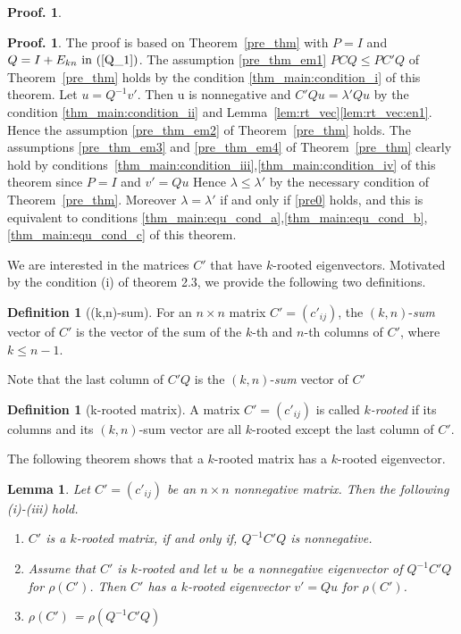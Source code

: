 \documentclass{article}
\theoremstyle{plain}
\newtheorem{lem}[thm]{Lemma}
\theoremstyle{definition}
\newtheorem{defn}[thm]{Definition}
\newtheorem{pof}[thm]{Proof.}
\begin{document}
\begin{pof}
   
\begin{pof}
    The proof is based on Theorem~\ref{pre_thm} with $P = I$ and $Q = I + E_{kn} \text{ in } (\ref{Q_1} )$. 
    The assumption \ref{pre_thm_em1} $PCQ\leq PC'Q$ of Theorem~\ref{pre_thm} holds by the condition \ref{thm_main:condition_i} of this theorem. 
    Let $u = Q^{-1}v'$. Then u is nonnegative and $C'Qu = \lambda' Qu$ by the condition \ref{thm_main:condition_ii} and
     Lemma~\ref{lem:rt_vec}\ref{lem:rt_vec:en1}. Hence the assumption \ref{pre_thm_em2} of Theorem~\ref{pre_thm} holds. The assumptions \ref{pre_thm_em3} and \ref{pre_thm_em4}
      of Theorem~\ref{pre_thm} clearly hold by conditions~\ref{thm_main:condition_iii},\ref{thm_main:condition_iv} of this theorem since $P = I$ and
       $v'= Qu$  Hence $\lambda \leq \lambda' $ by the necessary condition of Theorem~\ref{pre_thm}. Moreover
        $\lambda = \lambda'$ if and only if \ref{pre0} holds, and this is equivalent to
         conditions \ref{thm_main:equ_cond_a},\ref{thm_main:equ_cond_b},\ref{thm_main:equ_cond_c} of this theorem. 
    \end{pof}   
    
    We are interested in the matrices $C'$ that have $k$-rooted eigenvectors.
    Motivated by the condition (i) of theorem 2.3, we provide the following two definitions. 

    \begin{defn}[(k,n)-sum]
        For an $n \times n$ matrix $C'=(c'_{ij})$, the $(k, n)$-{\it sum} vector of $C'$ is the vector of the sum of the $k$-th and  $n$-th columns of $C'$, where $k\leq n-1$.
    \end{defn}

    Note that the last column of $C'Q$ is the $(k, n)$-{\it sum} vector of $C'$

    \begin{defn}[k-rooted matrix]\label{m_rooted}
        A  matrix $C'=(c'_{ij})$ is called {\it $k$-rooted}  if its  columns and its $(k, n)$-sum vector are all $k$-rooted except the last column of $C'$.
    \end{defn}

    The following theorem shows that a $k$-rooted matrix has a $k$-rooted eigenvector.
    \begin{lem}\label{lma_m_rooted}
        Let $C'=(c'_{ij})$ be an $n\times n$ nonnegative matrix. Then the following (i)-(iii) hold.
            \begin{enumerate}[label=(\Roman*)]
                \item $C'$ is a $k$-rooted matrix, if and only if, $Q^{-1}C'Q$ is nonnegative.
                \item Assume that $C'$ is $k$-rooted and let $u$ be a nonnegative eigenvector of $Q^{-1}C'Q$
                 for $\rho(C')$. Then  $C'$ has a $k$-rooted eigenvector $v'=Qu$ for $\rho(C')$. 
                \item $\rho(C')$ = $\rho(Q^{-1}C'Q)$
            \end{enumerate}
    \end{lem}


\end{pof}
\end{document}
